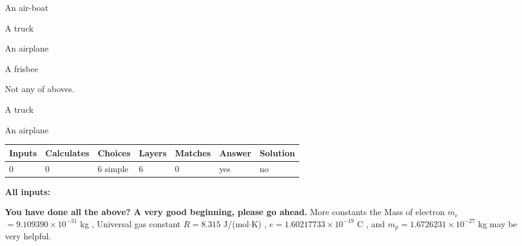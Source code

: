 \documentclass[12pt]{article}
\begin{document}
 
An air-boat
 
 
A truck
 
 
An airplane
 
 
A frisbee
 
 
  Not any of aboves.
 
 
\noindent{}
 
 
A truck
 
 
An airplane
 
 
\noindent{}
 
 
 
\vspace{0.3in}
   
   
   
   
\noindent\begin{tabular}{|l|l|l|l|l|l|l|}
 \hline
Inputs & Calculates & Choices & Layers & Matches & Answer & Solution \\ \hline
           0 & 
           0 & 
           6
  simple  
  & 
           6 & 
           0 & 
  yes & 
  no 
  \\ \hline
 \end{tabular}
   
   
   
   
\noindent{}
   
   
   
   
\noindent\vspace{0.1in}\hspace{-0.08in} {\textbf{\Large{All inputs: }}}
   
   
   
   
\vspace{0.3in}
{\textbf{\LARGE{You have done all the above? A very good beginning, please go ahead.}}}
More constants the
Mass of electron
$m_e$$ =
9.109390 \times 10^{-31} $
kg
,
Universal gas constant
$R$$ =
8.315 $
J/(mol$\cdot $K)
,
$e$$ =
1.60217733 \times 10^{-19} $
C
, and
$m_p$$ =
1.6726231 \times 10^{-27} $
kg
%
may be very helpful.
\vspace{0.3in}
   
   
  
\end{document}
